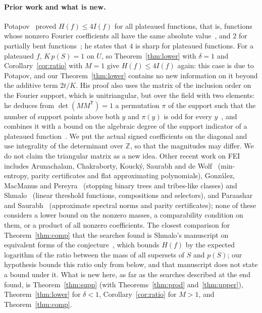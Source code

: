 \documentclass[11pt]{article}
\theoremstyle{definition}
\theoremstyle{remark}
\newcommand{\Z}{\mathbb Z}
\begin{document}
\paragraph{Prior work and what is new.} Potapov~\cite{pot} proved $H(f)\le4I(f)$
for all plateaued functions, that is, functions whose nonzero Fourier
coefficients all have the same absolute value~\cite[Theorem~2]{pot}, and $2$
for partially bent functions~\cite[Theorem~1]{pot}; he states that $4$ is sharp
for plateaued functions. For a plateaued $f$, $K\,p(S)=1$ on $U$, so
Theorem~\ref{thm:lower} with $\delta=1$ and Corollary~\ref{cor:ratio} with
$M=1$ give $H(f)\le4I(f)$ again: this case is due to Potapov, and our
Theorem~\ref{thm:lower} contains no new information on it beyond the additive
term $2t/K$. His proof also uses the matrix of the inclusion order on the
Fourier support, which is unitriangular, but over the field with two elements:
he deduces from $\det(MM^{\mathsf T})=1$ a permutation $\pi$ of the support
such that the number of support points above both $y$ and $\pi(y)$ is odd for
every $y$~\cite[Lemma~1]{pot}, and combines it with a bound on
the algebraic degree of the support indicator of a plateaued
function~\cite[Proposition~4 and Theorem~3]{pot}. We put the actual signed
coefficients on the diagonal and use integrality of the determinant over
$\Z$, so that the magnitudes may differ. We do not claim the triangular matrix
as a new idea. Other recent work on FEI includes Arunachalam, Chakraborty,
Koucký, Saurabh and de Wolf~\cite{acksw} (min-entropy, parity certificates and
flat approximating polynomials), Gonz\'alez, MacManus and Pereyra~\cite{gmp}
(stopping binary trees and tribes-like classes) and Shmalo~\cite{shm} (linear
threshold functions, compositions and selectors), and Paraashar and
Saurabh~\cite{ps} (approximate spectral norms and parity certificates); none
of these considers a
lower bound on the nonzero masses, a comparability condition on them, or a
product of all nonzero coefficients. The closest comparison for
Theorem~\ref{thm:comp} that the searches found is Shmalo's manuscript on
equivalent forms of the conjecture~\cite{shm2}, which bounds $H(f)$ by the
expected logarithm of the ratio between the mass of all supersets of $S$ and
$p(S)$; our hypothesis bounds this ratio only from below, and that manuscript
does not state a bound under it. What is new here, as far as the searches
described at the end found, is Theorem~\ref{thm:supp} (with
Theorems~\ref{thm:prod} and~\ref{thm:upper}), Theorem~\ref{thm:lower} for
$\delta<1$, Corollary~\ref{cor:ratio} for $M>1$, and Theorem~\ref{thm:comp}.
\end{document}
